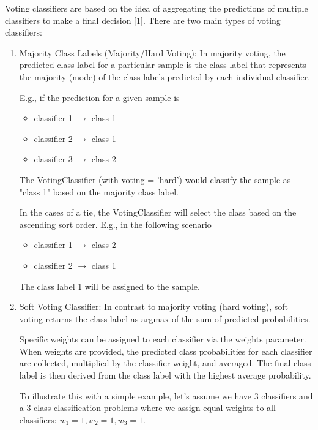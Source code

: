\documentclass[11pt]{article}
\providecommand{\tightlist}{%
      \setlength{\itemsep}{0pt}\setlength{\parskip}{0pt}}
\begin{document}
    Voting classifiers are based on the idea of aggregating the predictions
of multiple classifiers to make a final decision {[}1{]}. There are two
main types of voting classifiers:

\begin{enumerate}
\def\labelenumi{\arabic{enumi}.}
\item
  Majority Class Labels (Majority/Hard Voting): In majority voting, the
  predicted class label for a particular sample is the class label that
  represents the majority (mode) of the class labels predicted by each
  individual classifier.

  E.g., if the prediction for a given sample is

  \begin{itemize}
  \tightlist
  \item
    classifier 1 $\rightarrow$ class 1
  \item
    classifier 2 $\rightarrow$ class 1
  \item
    classifier 3 $\rightarrow$ class 2
  \end{itemize}

  The VotingClassifier (with voting = 'hard') would classify the sample as  "class 1" based on the majority class label.

  In the cases of a tie, the VotingClassifier will select the class
  based on the ascending sort order. E.g., in the following scenario

  \begin{itemize}
  \tightlist
  \item
    classifier 1 $\rightarrow$ class 2
  \item
    classifier 2 $\rightarrow$ class 1
  \end{itemize}

  The class label 1 will be assigned to the sample.
  
\item
  Soft Voting Classifier: In contrast to majority voting (hard voting),
  soft voting returns the class label as argmax of the sum of predicted
  probabilities.

  Specific weights can be assigned to each classifier via the weights
  parameter. When weights are provided, the predicted class
  probabilities for each classifier are collected, multiplied by the
  classifier weight, and averaged. The final class label is then derived
  from the class label with the highest average probability.

  To illustrate this with a simple example, let's assume we have 3
  classifiers and a 3-class classification problems where we assign
  equal weights to all classifiers: $w_1 = 1, w_2 = 1, w_3 = 1$.


\end{enumerate}
\end{document}
